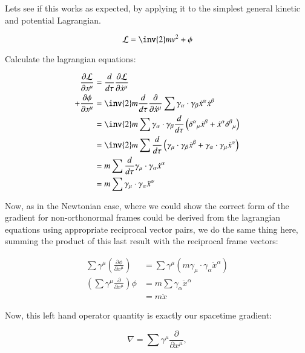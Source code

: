 \documentclass{article}
\newcommand{\grad}[0] {\nabla}
\newcommand{\xdot}[0]{\dot{x}}
\begin{document}
Lets see if this works as expected, by applying it to the simplest general
kinetic and potential Lagrangian.

\begin{equation}
\mathcal{L} = \inv{2} m v^2 + \phi
\end{equation}

Calculate the lagrangian equations:

\begin{align*}
\frac{\partial \mathcal{L}}{\partial x^{\mu}} &= \frac{d}{d\tau} \frac{\partial \mathcal{L}}{\partial \xdot^{\mu}} \\
+ \frac{\partial \phi}{\partial x^{\mu}} 
&= \inv{2} m \frac{d}{d\tau} \frac{\partial}{\partial \xdot^{\mu}} \sum \gamma_{\alpha} \cdot \gamma_{\beta} \xdot^{\alpha} \xdot^{\beta} \\
&= \inv{2} m \sum \gamma_{\alpha} \cdot \gamma_{\beta} \frac{d}{d\tau} \left({\delta^{\alpha}}_{\mu} \xdot^{\beta} + \xdot^{\alpha} {\delta^{\beta}}_{\mu}\right) \\
&= \inv{2} m \sum \frac{d}{d\tau}
\left(\gamma_{\mu} \cdot \gamma_{\beta} \xdot^{\beta} + \gamma_{\alpha} \cdot \gamma_{\mu} \xdot^{\alpha} \right) \\
&= m \sum \frac{d}{d\tau} \gamma_{\mu} \cdot \gamma_{\alpha} \xdot^{\alpha} \\
&= m \sum \gamma_{\mu} \cdot \gamma_{\alpha} \ddot{x}^{\alpha} \\
\end{align*}

Now, as in the Newtonian case, where we could show the correct form of the gradient for non-orthonormal frames could be derived from the lagrangian equations using appropriate reciprocal vector pairs, we do the same thing here, summing the product of this last result with the reciprocal frame vectors:

\begin{align*}
\sum \gamma^{\mu} \left(\frac{\partial \phi}{\partial x^{\mu}}\right) &= \sum \gamma^{\mu} \left(m \gamma_{\mu} \cdot \gamma_{\alpha} \ddot{x}^{\alpha}\right) \\
\left(\sum \gamma^{\mu} \frac{\partial}{\partial x^{\mu}}\right) \phi 
&= m \sum \gamma_{\alpha} \ddot{x}^{\alpha} \\
&= m \ddot{x}
\end{align*}

Now, this left hand operator quantity is exactly our spacetime gradient:

\begin{equation}
\grad = \sum \gamma^{\mu} \frac{\partial}{\partial x^{\mu}},
\end{equation}
\end{document}

